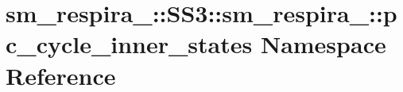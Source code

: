 \hypertarget{namespacesm__respira__1_1_1SS3_1_1sm__respira__1_1_1pc__cycle__inner__states}{}\section{sm\+\_\+respira\+\_\+:\+:S\+S3\+:\+:sm\+\_\+respira\+\_\+:\+:pc\+\_\+cycle\+\_\+inner\+\_\+states Namespace Reference}
\label{namespacesm__respira__1_1_1SS3_1_1sm__respira__1_1_1pc__cycle__inner__states}

